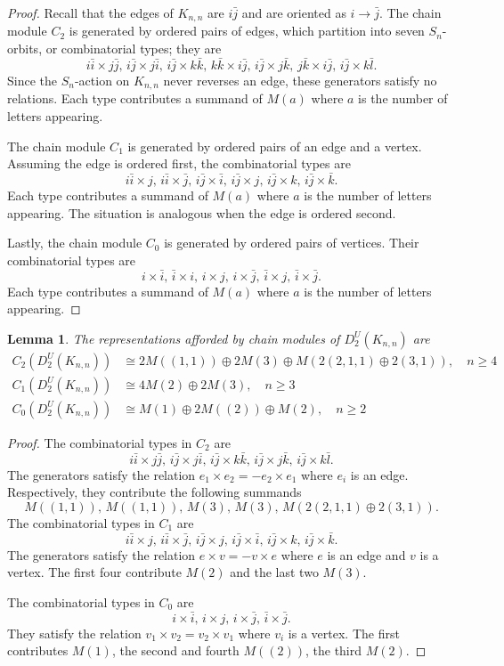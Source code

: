\documentclass[12pt]{amsart}
\newtheorem{lem}[thm]{Lemma}
\theoremstyle{definition}
\begin{document}
\begin{proof}
Recall that the edges of $K_{n,n}$ are ${i\bar j}$ and are oriented as $i\to \bar j$. The chain module $C_2$ is generated by ordered pairs of edges, which partition into seven $S_n$-orbits, or combinatorial types; they are
\[
{i\bar i}\times {j\bar j}, \,{i\bar j}\times {j\bar i},\,
{i\bar j}\times {k\bar k}, \,{k\bar k}\times {i\bar j}, \,{i\bar j}\times {j\bar k}, \,{j\bar k}\times {i\bar j}, \,
{i\bar j}\times {k\bar l}.
\] Since the $S_n$-action on $K_{n,n}$ never reverses an edge, these generators satisfy no relations. Each type contributes a summand of $M(a)$ where $a$ is the number of letters appearing.

The chain module $C_1$ is generated by ordered pairs of an edge and a vertex. Assuming the edge is ordered first, the combinatorial types are
\[
{i\bar i} \times j,\,{i\bar i} \times \bar j,\,{i\bar j} \times \bar i,\,{i\bar j} \times j,\,{i\bar j} \times k,\,{i\bar j} \times \bar k.
\] Each type contributes a summand of $M(a)$ where $a$ is the number of letters appearing. The situation is analogous when the edge is ordered second.

Lastly, the chain module $C_0$ is generated by ordered pairs of vertices. Their combinatorial types are
\[
i\times \bar i,\,\bar i\times i,\,i\times j,\,i\times\bar j,\,\bar i\times j,\,\bar i\times \bar j.
\] Each type contributes a summand of $M(a)$ where $a$ is the number of letters appearing.
\end{proof}

\begin{lem}
The representations afforded by chain modules of $D^U_2(K_{n,n})$ are
\begin{align*}
C_2(D^U_2(K_{n,n})) &\cong 2M((1,1))\oplus 2M(3)\oplus M(2(2,1,1)\oplus 2(3,1)),\quad n\geq 4\\
C_1(D^U_2(K_{n,n})) &\cong 4M(2)\oplus 2M(3),\quad n\geq 3\\
C_0(D^U_2(K_{n,n})) &\cong M(1)\oplus 2M((2)) \oplus M(2),\quad n\geq 2
\end{align*}
\end{lem}
\begin{proof}
The combinatorial types in $C_2$ are
\[
{i\bar i}\times{j\bar j},\,{i\bar j}\times{j\bar i},\,{i\bar j}\times{k\bar k},\,{i\bar j}\times{j\bar k},\,{i\bar j}\times{k\bar l}.
\] The generators satisfy the relation $e_1\times e_2=-e_2\times e_1$ where $e_i$ is an edge. Respectively, they contribute the following summands
\[
M((1,1)),\,M((1,1)),\,M(3),\,M(3),\,M(2(2,1,1)\oplus 2(3,1)).
\] The combinatorial types in $C_1$ are \[
{i\bar i}\times j,\,{i\bar i}\times \bar j,\,{i\bar j}\times j,\,{i\bar j}\times \bar i,\,{i\bar j}\times k,\,{i\bar j}\times \bar k.
\] The generators satisfy the relation $e\times v=-v\times e$ where $e$ is an edge and $v$ is a vertex. The first four contribute $M(2)$ and the last two $M(3)$. 

The combinatorial types in $C_0$ are \[
i\times \bar i,\,i\times  j,\,i\times \bar j,\,\bar i\times \bar j.
\] They satisfy the relation $v_1\times v_2=v_2\times v_1$ where $v_i$ is a vertex. The first contributes $M(1)$, the second and fourth $M((2))$, the third $M(2)$.
\end{proof}
\end{document}
